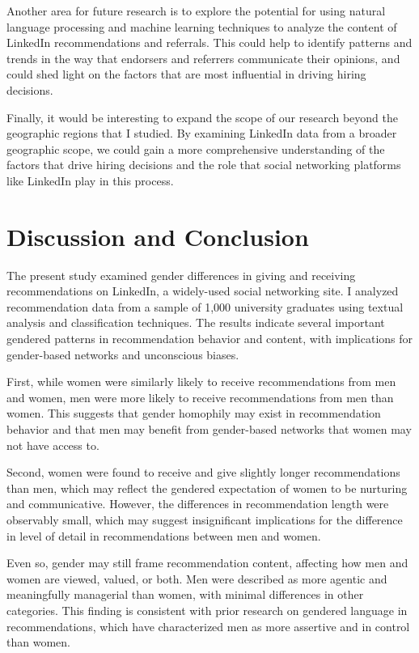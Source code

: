 \documentclass[12pt]{caltech_thesis}
\begin{document}
Another area for future research is to explore the potential for using natural language processing and machine learning techniques to analyze the content of LinkedIn recommendations and referrals. This could help to identify patterns and trends in the way that endorsers and referrers communicate their opinions, and could shed light on the factors that are most influential in driving hiring decisions.

Finally, it would be interesting to expand the scope of our research beyond the geographic regions that I studied. By examining LinkedIn data from a broader geographic scope, we could gain a more comprehensive understanding of the factors that drive hiring decisions and the role that social networking platforms like LinkedIn play in this process.


\chapter{Discussion and Conclusion}
The present study examined gender differences in giving and receiving recommendations on LinkedIn, a widely-used social networking site.  I analyzed recommendation data from a sample of 1,000 university graduates using textual analysis and classification techniques. The results indicate several important gendered patterns in recommendation behavior and content, with implications for gender-based networks and unconscious biases.

First, while women were similarly likely to receive recommendations from men and women, men were more likely to receive recommendations from men than women. This suggests that gender homophily may exist in recommendation behavior and that men may benefit from gender-based networks that women may not have access to. 

Second, women were found to receive and give slightly longer recommendations than men, which may reflect the gendered expectation of women to be nurturing and communicative. However, the differences in recommendation length were observably small, which may suggest insignificant implications for the difference in level of detail in recommendations between men and women.

Even so, gender may still frame recommendation content, affecting how men and women are viewed, valued, or both. Men were described as more agentic and meaningfully managerial than women, with minimal differences in other categories.  This finding is consistent with prior research on gendered language in recommendations, which have characterized men as more assertive and in control than women.
\end{document}
